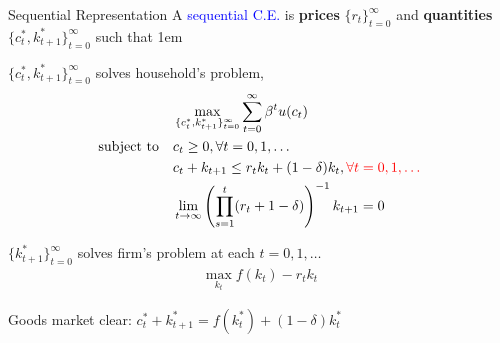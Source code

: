 \documentclass[11pt,aspectratio=43,usenames,dvipsnames]{beamer}
\newcommand{\red}[1]{\textcolor{red}{#1}}
\newcommand{\blue}[1]{\textcolor{blue}{#1}}
\let\oldenumerate=\enumerate
\let\endoldenumerate=\endenumerate
\renewenvironment{enumerate}{\oldenumerate \itemsep1em}{ \endoldenumerate}
\theoremstyle{definition}
\begin{document}
\begin{frame}{Sequential Representation}
\label{slide:Sequential_Representation}
    \small
    A \blue{sequential C.E.} is \textbf{prices} $ \{r_{t}\}_{t=0}^{\infty} $ and \textbf{quantities} $ \{c_{t}^{*}, k_{t+1}^{*}\}_{t=0}^{\infty} $ such that
\begin{enumerate}
    \item $\{c_{t}^{*}, k_{t+1}^{*}\}_{t=0}^{\infty}$ solves household's problem,
     \begin{align}
             & \max_{\{c_{t}^{*}, k_{t+1}^{*}\}_{t=0}^{\infty}} \sum_{t=0}^{\infty} \beta^{t} u(c_{t})
         \\
         \text{subject to} \quad
             & c_{t} \ge 0, \forall t = 0, 1, \ldots
         \\
            & c_{t} + k_{t+1} \le r_{t} k_{t} + (1-\delta) k_{t}, \red{\forall t = 0, 1, \ldots}
         \\
            & \label{eq:transversality} \lim_{t\rightarrow \infty} \left(\prod_{s=1}^{t} (r_{t} + 1 - \delta)\right)^{-1} k_{t+1} = 0
     \end{align}
    \item $\{k_{t+1}^{*}\}_{t=0}^{\infty}$ solves firm's problem at each $ t = 0, 1, \ldots $
    \begin{align}
        \max_{k_{t}} f(k_{t}) - r_{t}k_{t}
    \end{align}
    \item Goods market clear: $ c_{t}^{*} + k_{t+1}^{*} = f(k_{t}^{*}) + (1-\delta) k_{t}^{*} $
\end{enumerate}
\end{frame}
\end{document}
